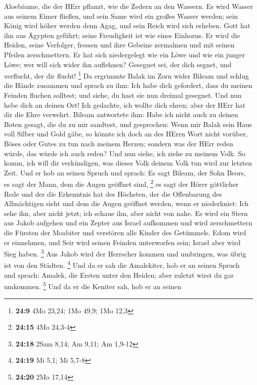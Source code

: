 Aloebäume, die der HErr pflanzt, wie die Zedern an den Wassern.
 Es wird Wasser aus seinem Eimer fließen, und sein Same wird
ein großes Wasser werden; sein König wird höher werden denn Agag, und
sein Reich wird sich erheben.  Gott hat ihn aus Ägypten
geführt; seine Freudigkeit ist wie eines Einhorns. Er wird die Heiden,
seine Verfolger, fressen und ihre Gebeine zermalmen und mit seinen
Pfeilen zerschmettern.  Er hat sich niedergelegt wie ein
Löwe und wie ein junger Löwe; wer will sich wider ihn auflehnen?
Gesegnet sei, der dich segnet, und verflucht, der dir flucht!
\footnote{\textbf{24:9} 4Mo 23,24; 1Mo 49,9; 1Mo 12,3}  Da
ergrimmte Balak im Zorn wider Bileam und schlug die Hände zusammen und
sprach zu ihm: Ich habe dich gefordert, dass du meinen Feinden fluchen
solltest; und siehe, du hast sie nun dreimal gesegnet.  Und
nun hebe dich an deinen Ort! Ich gedachte, ich wollte dich ehren; aber
der HErr hat dir die Ehre verwehrt.  Bileam antwortete ihm:
Habe ich nicht auch zu deinen Boten gesagt, die du zu mir sandtest, und
gesprochen:  Wenn mir Balak sein Haus voll Silber und Gold
gäbe, so könnte ich doch an des HErrn Wort nicht vorüber, Böses oder
Gutes zu tun nach meinem Herzen; sondern was der HErr reden würde, das
würde ich auch reden?  Und nun siehe, ich ziehe zu meinem
Volk. So komm, ich will dir verkündigen, was dieses Volk deinem Volk tun
wird zur letzten Zeit.  Und er hob an seinen Spruch und
sprach: Es sagt Bileam, der Sohn Beors, es sagt der Mann, dem die Augen
geöffnet sind, \footnote{\textbf{24:15} 4Mo 24,3-4}  es
sagt der Hörer göttlicher Rede und der die Erkenntnis hat des Höchsten,
der die Offenbarung des Allmächtigen sieht und dem die Augen geöffnet
werden, wenn er niederkniet:  Ich sehe ihn, aber nicht
jetzt; ich schaue ihn, aber nicht von nahe. Es wird ein Stern aus Jakob
aufgehen und ein Zepter aus Israel aufkommen und wird zerschmettern die
Fürsten der Moabiter und verstören alle Kinder des Getümmels.
 Edom wird er einnehmen, und Seir wird seinen Feinden
unterworfen sein; Israel aber wird Sieg haben. \footnote{\textbf{24:18}
  2Sam 8,14; Am 9,11; Am 1,9-12}  Aus Jakob wird der
Herrscher kommen und umbringen, was übrig ist von den Städten.
\footnote{\textbf{24:19} Mi 5,1; Mi 5,7-8}  Und da er sah
die Amalekiter, hob er an seinen Spruch und sprach: Amalek, die Ersten
unter den Heiden; aber zuletzt wirst du gar umkommen. \footnote{\textbf{24:20}
  2Mo 17,14}  Und da er die Keniter sah, hob er an seinen
